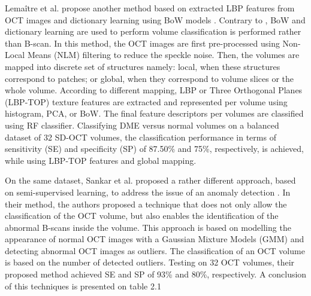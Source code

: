 Lema\^{i}tre et al. propose another method based on extracted LBP features from OCT images and dictionary learning using BoW models \cite{lemaitre2015classification}. Contrary to \cite{srinivasan2014fully}, BoW and dictionary learning are used to perform volume classification is performed rather than B-scan. In this method, the OCT images are first pre-processed using Non-Local Means (NLM) filtering to reduce the speckle noise.
Then, the volumes are mapped into discrete set of structures namely: local, when these structures correspond to patches; or global, when they correspond to volume slices or the whole volume.
According to different mapping, LBP or Three Orthogonal Planes (LBP-TOP) texture features are extracted and represented per volume using histogram, PCA, or BoW.
The final feature descriptors per volumes are classified using RF classifier.
Classifying DME versus normal volumes on a balanced dataset of 32 SD-OCT volumes, the classification performance in terms of sensitivity (SE) and specificity (SP) of 87.50\% and 75\%, respectively, is achieved, while using LBP-TOP features and global mapping.

On the same dataset, Sankar et al. proposed a rather different approach, based on semi-supervised learning, to address the issue of an anomaly detection \cite{sankar2016classification}.
In their method, the authors proposed a technique that does not only allow the classification
of the OCT volume, but also enables the identification of the abnormal B-scans inside the volume.
This approach is based on modelling the appearance of normal OCT images with a Gaussian Mixture Models (GMM) and detecting abnormal OCT images as outliers.
The classification of an OCT volume is based on the number of detected outliers.
Testing on 32 OCT volumes, their proposed method achieved SE and SP of 93\% and 80\%, respectively.
A conclusion of this techniques is presented on table 2.1


